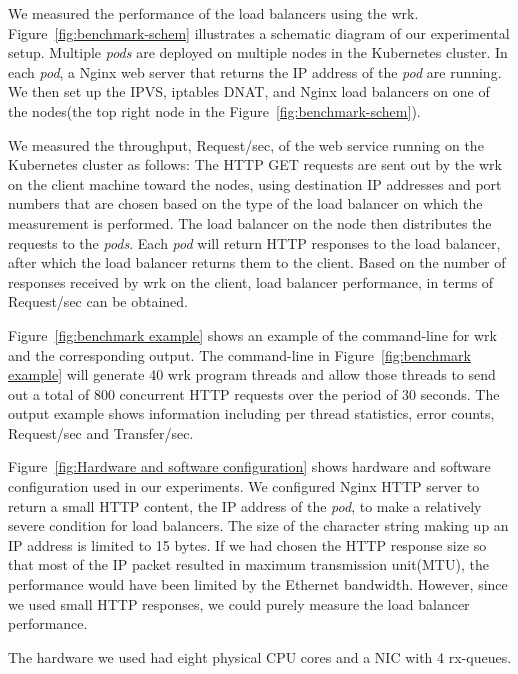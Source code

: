 We measured the performance of the load balancers using the wrk.
Figure~\ref{fig:benchmark-schem} illustrates a schematic diagram of our experimental setup.
Multiple {\em pods} are deployed on multiple nodes in the Kubernetes cluster. 
In each {\em pod}, a Nginx web server that returns the IP address of the {\em pod} are running.
We then set up the IPVS, iptables DNAT, and Nginx load balancers on one of the nodes(the top right node in the Figure~\ref{fig:benchmark-schem}). 

We measured the throughput, Request/sec, of the web service running on the Kubernetes cluster as follows:
The HTTP GET requests are sent out by the wrk on the client machine toward the nodes,
using destination IP addresses and port numbers that are chosen based on the type of the load balancer on which the measurement is performed.
The load balancer on the node then distributes the requests to the {\em pods}.
Each {\em pod} will return HTTP responses to the load balancer, after which the load balancer returns them to the client.
Based on the number of responses received by wrk on the client, 
load balancer performance, in terms of Request/sec can be obtained. 

Figure~\ref{fig:benchmark example} shows an example of the command-line for wrk and the corresponding output.
The command-line in Figure~\ref{fig:benchmark example} will generate 40 wrk program threads 
and allow those threads to send out a total of 800 concurrent HTTP requests over the period of 30 seconds.
The output example shows information including per thread statistics, error counts, Request/sec and Transfer/sec.

Figure~\ref{fig:Hardware and software configuration} shows hardware and software configuration used in our experiments.
We configured Nginx HTTP server to return a small HTTP content, 
the IP address of the {\em pod}, to make a relatively severe condition for load balancers. 
The size of the character string making up an IP address is limited to 15 bytes.
If we had chosen the HTTP response size so that most of the IP packet resulted in maximum transmission unit(MTU), 
the performance would have been limited by the Ethernet bandwidth.
However, since we used small HTTP responses, we could purely measure the load balancer performance.

The hardware we used had eight physical CPU cores and a NIC with 4 rx-queues.


